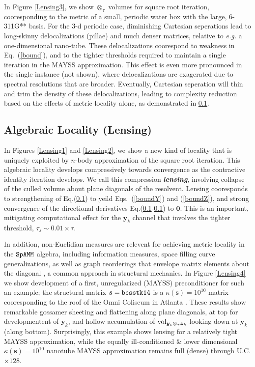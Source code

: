 \documentclass[letterpaper,twocolumn,amsmath,amsfont,amssymb,english,aps,jcp,preprintnumbers,groupaddress,nofootinbib,tightenlines,floatfix]{revtex4}
\newcommand{\mat}[1]{\boldsymbol{#1}}
\newcommand{\ot}{  {\scriptstyle \otimes}_{ \tau } }
\theoremstyle{plain}
\theoremstyle{remark}
\theoremstyle{plain}
\begin{document}

In Figure \ref{Lensing3}, we show $\ot$ volumes for square root iteration, cooresponding to the metric of a small, periodic water box 
with the large, 6-311G** basis.  For the 3-d periodic case, diminishing Cartesian seperations lead to long-skinny delocalizations (pillae)
and much denser matrices, relative to {\em e.g.} a one-dimensional nano-tube.  These delocalizations coorespond to weakness in Eq.~(\ref{bound}),  
and to the tighter thresholds required to maintain a single iteration in the MAYSS approximation.  This effect is even more pronounced in the 
single instance (not shown), where delocalizations are exagerated due to spectral resolutions that are broader.  
Eventually, Cartesian seperation will thin and trim the density of these delocalizations,  
leading to complexity reduction based on the effects of metric locality alone, as demonstrated in \ref{}.

\subsection{Algebraic Locality (Lensing)}

In Figures \ref{Lensing1} and \ref{Lensing2},  we show a new kind of locality that is uniquely exploited by $n$-body approximation 
of the square root iteration.  This {algebraic locality} develops compressively towards convergence 
as the contractive identity iteration develops.  
We call this compression {\bf  \em lensing},  involving collapse  of the culled volume about plane diagonals of the resolvent.
Lensing cooresponds to strengthening of Eq.(\ref{}) to yeild Eqs.~(\ref{boundY}) and (\ref{boundZ}), and strong convergence of the
directional derivatives Eq.(\ref{}-\ref{}) to $\mat{0}$.
This is an important, mitigating computational effect for the $\mat{y}_k$ channel that involves the 
tighter threshold, $\tau_s \sim 0.01 \times \tau$. 

In addition, non-Euclidian measures are relevent for achieving metric locality in 
the $\tt SpAMM$ algebra, including information measures, space filling curve generalizations, as well 
as graph reorderings that envelope matrix elements about the diagonal \cite{}, a common approach in 
structural mechanics.   In Figure \ref{Lensing4} we show development of a first, unregularized (MAYSS) 
preconditioner for such an example; the structural matrix $\mat{s}={\tt bcsstk14}$ is a $\kappa(\mat{s})=10^{10}$ matrix 
cooresponding to the roof of the Omni Coliseum in Atlanta \cite{}.  These results show remarkable 
gossamer sheeting and flattening along plane diagonals, at top for developmentent of $\mat{y}_k$, 
and hollow accumulation of ${\rm vol}_{\mat{y}_k \ot \mat{z}_k}$ looking down at $\mat{y}_k$ (along bottom).
Surprisingly, this example shows lensing for a relatively tight MAYSS approximation, while the 
equally ill-conditioned \& lower dimensional  $\kappa (\mat{s})=10^{10}$ nanotube MAYSS approximation remains full (dense) 
through U.C. $\times 128$.
\end{document}
